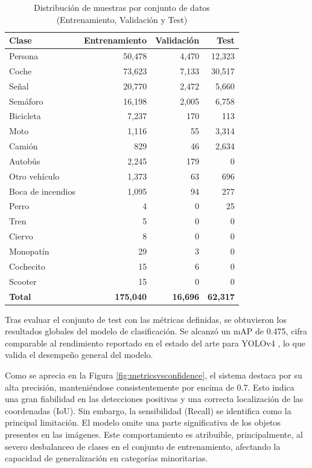 \documentclass{article}
\begin{document}
\begin{table}[H]
	\centering
	\begin{tabular}{lrrr}
		\toprule
		\textbf{Clase} & \textbf{Entrenamiento} & \textbf{Validación} & \textbf{Test} \\
		\midrule
		Persona & 50,478 & 4,470 & 12,323 \\
		Coche & 73,623 & 7,133 & 30,517 \\
		Señal & 20,770 & 2,472 & 5,660 \\
		Semáforo & 16,198 & 2,005 & 6,758 \\
		Bicicleta & 7,237 & 170 & 113 \\
		Moto & 1,116 & 55 & 3,314 \\
		Camión & 829 & 46 & 2,634 \\
		Autobús & 2,245 & 179 & 0 \\
		Otro vehículo & 1,373 & 63 & 696 \\
		Boca de incendios & 1,095 & 94 & 277 \\
		Perro & 4 & 0 & 25 \\
		Tren & 5 & 0 & 0 \\
		Ciervo & 8 & 0 & 0 \\
		Monopatín & 29 & 3 & 0 \\
		Cochecito & 15 & 6 & 0 \\
		Scooter & 15 & 0 & 0 \\
		\midrule
		\textbf{Total} & \textbf{175,040} & \textbf{16,696} & \textbf{62,317} \\
		\bottomrule
	\end{tabular}
	\caption{Distribución de muestras por conjunto de datos (Entrenamiento, Validación y Test)}
	\label{tab:dataset-dist}
\end{table}

Tras evaluar el conjunto de test con las métricas definidas, se obtuvieron los resultados globales del modelo de clasificación. Se alcanzó un mAP de 0.475, cifra comparable al rendimiento reportado en el estado del arte para YOLOv4 \cite{bochkovskiy2020yolov4optimalspeedaccuracy}, lo que valida el desempeño general del modelo.

Como se aprecia en la Figura \ref{fig:metricsvsconfidence}, el sistema destaca por su alta precisión, manteniéndose consistentemente por encima de 0.7. Esto indica una gran fiabilidad en las detecciones positivas y una correcta localización de las coordenadas (IoU). Sin embargo, la sensibilidad (Recall) se identifica como la principal limitación. El modelo omite una parte significativa de los objetos presentes en las imágenes. Este comportamiento es atribuible, principalmente, al severo desbalanceo de clases en el conjunto de entrenamiento, afectando la capacidad de generalización en categorías minoritarias.	
\end{document}
